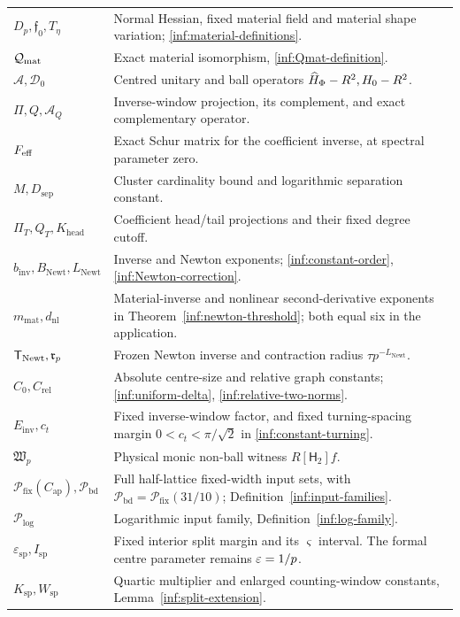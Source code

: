 \begin{longtable}{@{}>{\raggedright\arraybackslash}p{}>{\raggedright\arraybackslash}p{}@{}}
$D_p,\mathfrak f_0,T_\eta$ & Normal Hessian, fixed material field and material shape variation; \eqref{inf:material-definitions}.\\
$\mathcal Q_{\mathrm{mat}}$ & Exact material isomorphism, \eqref{inf:Qmat-definition}.\\
$\mathcal A,\mathcal D_0$ & Centred unitary and ball operators $\widehat H_\Phi-R^2,H_0-R^2$.\\
$\Pi,Q,\mathcal A_Q$ & Inverse-window projection, its complement, and exact complementary operator.\\
$F_{\mathrm{eff}}$ & Exact Schur matrix for the coefficient inverse, at spectral parameter zero.\\
$M,D_{\mathrm{sep}}$ & Cluster cardinality bound and logarithmic separation constant.\\
$\Pi_T,Q_T,K_{\mathrm{head}}$ & Coefficient head/tail projections and their fixed degree cutoff.\\
$b_{\mathrm{inv}},B_{\mathrm{Newt}},L_{\mathrm{Newt}}$ & Inverse and Newton exponents; \eqref{inf:constant-order}, \eqref{inf:Newton-correction}.\\
$m_{\mathrm{mat}},d_{\mathrm{nl}}$ & Material-inverse and nonlinear second-derivative exponents in Theorem~\ref{inf:newton-threshold}; both equal six in the application.\\
$\mathsf T_{\mathrm{Newt}},\mathfrak r_p$ & Frozen Newton inverse and contraction radius $\tau p^{-L_{\mathrm{Newt}}}$.\\
$C_0,C_{\mathrm{rel}}$ & Absolute centre-size and relative graph constants; \eqref{inf:uniform-delta}, \eqref{inf:relative-two-norms}.\\
$E_{\mathrm{inv}},c_t$ & Fixed inverse-window factor, and fixed turning-spacing margin $0<c_t<\pi/\sqrt2$ in \eqref{inf:constant-turning}.\\
$\mathfrak W_p$ & Physical monic non-ball witness $R[\mathsf H_2]f$.\\
$\mathcal P_{\mathrm{fix}}(C_{\mathrm{ap}}),\mathcal P_{\mathrm{bd}}$ & Full half-lattice fixed-width input sets, with $\mathcal P_{\mathrm{bd}}=\mathcal P_{\mathrm{fix}}(31/10)$; Definition~\ref{inf:input-families}.\\
$\mathcal P_{\log}$ & Logarithmic input family, Definition~\ref{inf:log-family}.\\
$\varepsilon_{\mathrm{sp}},I_{\mathrm{sp}}$ & Fixed interior split margin and its $\varsigma$ interval. The formal centre parameter remains $\varepsilon=1/p$.\\
$K_{\mathrm{sp}},W_{\mathrm{sp}}$ & Quartic multiplier and enlarged counting-window constants, Lemma~\ref{inf:split-extension}.\\

\end{longtable}
